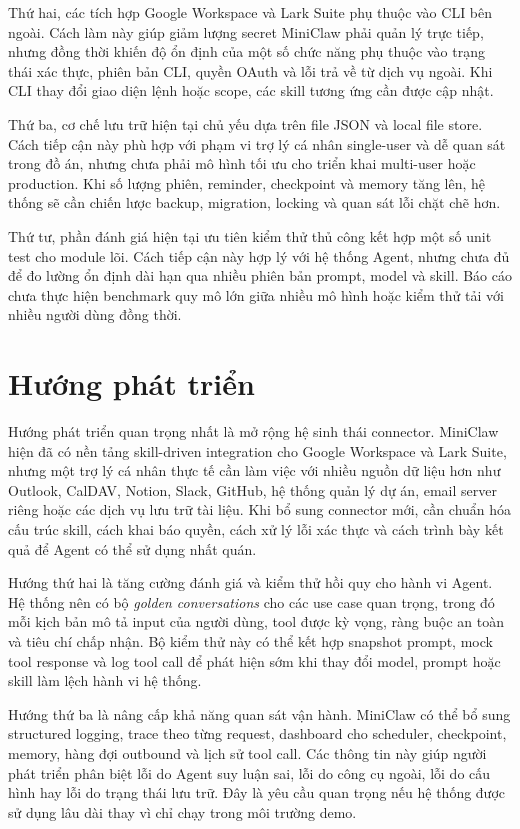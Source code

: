 Thứ hai, các tích hợp Google Workspace và Lark Suite phụ thuộc vào CLI bên ngoài. Cách làm này giúp giảm lượng secret MiniClaw phải quản lý trực tiếp, nhưng đồng thời khiến độ ổn định của một số chức năng phụ thuộc vào trạng thái xác thực, phiên bản CLI, quyền OAuth và lỗi trả về từ dịch vụ ngoài. Khi CLI thay đổi giao diện lệnh hoặc scope, các skill tương ứng cần được cập nhật.

Thứ ba, cơ chế lưu trữ hiện tại chủ yếu dựa trên file JSON và local file store. Cách tiếp cận này phù hợp với phạm vi trợ lý cá nhân single-user và dễ quan sát trong đồ án, nhưng chưa phải mô hình tối ưu cho triển khai multi-user hoặc production. Khi số lượng phiên, reminder, checkpoint và memory tăng lên, hệ thống sẽ cần chiến lược backup, migration, locking và quan sát lỗi chặt chẽ hơn.

Thứ tư, phần đánh giá hiện tại ưu tiên kiểm thử thủ công kết hợp một số unit test cho module lõi. Cách tiếp cận này hợp lý với hệ thống Agent, nhưng chưa đủ để đo lường ổn định dài hạn qua nhiều phiên bản prompt, model và skill. Báo cáo chưa thực hiện benchmark quy mô lớn giữa nhiều mô hình hoặc kiểm thử tải với nhiều người dùng đồng thời.

\section{Hướng phát triển}
Hướng phát triển quan trọng nhất là mở rộng hệ sinh thái connector. MiniClaw hiện đã có nền tảng skill-driven integration cho Google Workspace và Lark Suite, nhưng một trợ lý cá nhân thực tế cần làm việc với nhiều nguồn dữ liệu hơn như Outlook, CalDAV, Notion, Slack, GitHub, hệ thống quản lý dự án, email server riêng hoặc các dịch vụ lưu trữ tài liệu. Khi bổ sung connector mới, cần chuẩn hóa cấu trúc skill, cách khai báo quyền, cách xử lý lỗi xác thực và cách trình bày kết quả để Agent có thể sử dụng nhất quán.

Hướng thứ hai là tăng cường đánh giá và kiểm thử hồi quy cho hành vi Agent. Hệ thống nên có bộ \textit{golden conversations} cho các use case quan trọng, trong đó mỗi kịch bản mô tả input của người dùng, tool được kỳ vọng, ràng buộc an toàn và tiêu chí chấp nhận. Bộ kiểm thử này có thể kết hợp snapshot prompt, mock tool response và log tool call để phát hiện sớm khi thay đổi model, prompt hoặc skill làm lệch hành vi hệ thống.

Hướng thứ ba là nâng cấp khả năng quan sát vận hành. MiniClaw có thể bổ sung structured logging, trace theo từng request, dashboard cho scheduler, checkpoint, memory, hàng đợi outbound và lịch sử tool call. Các thông tin này giúp người phát triển phân biệt lỗi do Agent suy luận sai, lỗi do công cụ ngoài, lỗi do cấu hình hay lỗi do trạng thái lưu trữ. Đây là yêu cầu quan trọng nếu hệ thống được sử dụng lâu dài thay vì chỉ chạy trong môi trường demo.

